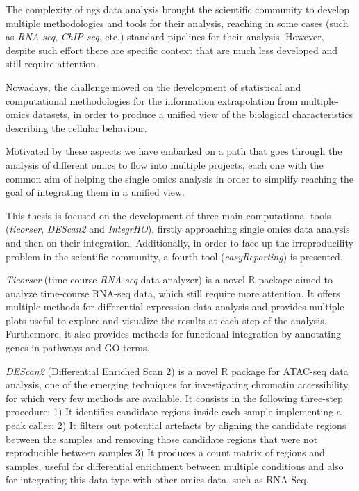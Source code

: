 The complexity of \gls{ngs} data analysis brought the scientific community to develop multiple methodologies and tools for their analysis, reaching in some cases (such as \textit{RNA-seq}, \textit{ChIP-seq}, etc.) standard pipelines for their analysis.
However, despite such effort there are specific context that are much less developed and still require attention.

Nowadays, the challenge moved on the development of statistical and computational methodologies for the information extrapolation from multiple-omics datasets, in order to produce a unified view of the biological characteristics describing the cellular behaviour.

Motivated by these aspects we have embarked on a path that goes through the analysis of different omics to flow into multiple projects, each one with the common aim of helping the single omics analysis in order to simplify reaching the goal of integrating them in a unified view.

This thesis is focused on the development of three main computational tools (\textit{ticorser}, \textit{DEScan2} and \textit{IntegrHO}), firstly approaching single omics data analysis and then on their integration.
Additionally, in order to face up the irreproducility problem in the scientific community, a fourth tool (\textit{easyReporting}) is presented.

\textit{Ticorser} (time course \textit{RNA-seq} data analyzer) is a novel R package aimed to analyze time-course RNA-seq data, which still require more attention. It offers multiple methods for differential expression data analysis and provides multiple plots useful to explore and visualize the results at each step of the analysis. Furthermore, it also provides methods for functional integration by annotating genes in pathways and GO-terms.

\textit{DEScan2} (Differential Enriched Scan 2) is a novel R package for ATAC-seq data analysis, one of the emerging techniques for investigating chromatin accessibility, for which very few methods are available. It consists in the following three-step procedure: 1) It identifies candidate regions inside each sample implementing a peak caller; 2) It filters out potential artefacts by aligning the candidate regions between the samples and removing those candidate regions that were not reproducible between samples 3) It produces a count matrix of regions and samples, useful for differential enrichment between multiple conditions and also for integrating this data type with other omics data, such as RNA-Seq.

